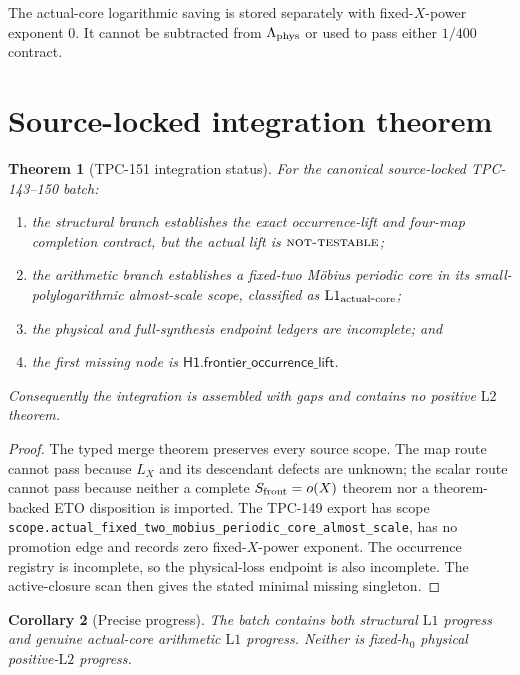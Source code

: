 \documentclass[11pt]{article}
\newtheorem{theorem}{Theorem}[section]
\newtheorem{corollary}[theorem]{Corollary}
\theoremstyle{definition}
\theoremstyle{remark}
\newcommand{\Lone}{\mathrm{L1}}
\newcommand{\Ltwo}{\mathrm{L2}}
\newcommand{\NT}{\textnormal{\textsc{not-testable}}}
\begin{document}
The actual-core logarithmic saving is stored separately with
fixed-\(X\)-power exponent \(0\).  It cannot be subtracted from
\(\Lambda_{\rm phys}\) or used to pass either \(1/400\) contract.

\section{Source-locked integration theorem}

\begin{theorem}[TPC-151 integration status]
\label{thm:status}
For the canonical source-locked TPC-143--150 batch:
\begin{enumerate}[label=(\roman*),leftmargin=2.2em]
\item the structural branch establishes the exact occurrence-lift and
  four-map completion contract, but the actual lift is \(\NT\);
\item the arithmetic branch establishes a fixed-two M\"obius periodic
  core in its small-polylogarithmic almost-scale scope, classified as
  \(\Lone_{\rm actual\mbox{-}core}\);
\item the physical and full-synthesis endpoint ledgers are incomplete;
  and
\item the first missing node is
  \(\mathsf{H1.frontier\_occurrence\_lift}\).
\end{enumerate}
Consequently the integration is assembled with gaps and contains no
positive \(\Ltwo\) theorem.
\end{theorem}

\begin{proof}
The typed merge theorem preserves every source scope.  The map route
cannot pass because \(L_X\) and its descendant defects are unknown;
the scalar route cannot pass because neither a complete
\(S_{\rm front}=o(X)\) theorem nor a theorem-backed ETO disposition is
imported.  The TPC-149 export has
scope
\nolinkurl{scope.actual_fixed_two_mobius_periodic_core_almost_scale},
has no promotion edge and records zero fixed-\(X\)-power exponent.
The occurrence registry is incomplete, so the physical-loss endpoint
is also incomplete.  The active-closure scan then gives the stated
minimal missing singleton.
\end{proof}

\begin{corollary}[Precise progress]
The batch contains both structural \(\Lone\) progress and genuine
actual-core arithmetic \(\Lone\) progress.  Neither is fixed-\(h_0\)
physical positive-\(\Ltwo\) progress.
\end{corollary}
\end{document}
